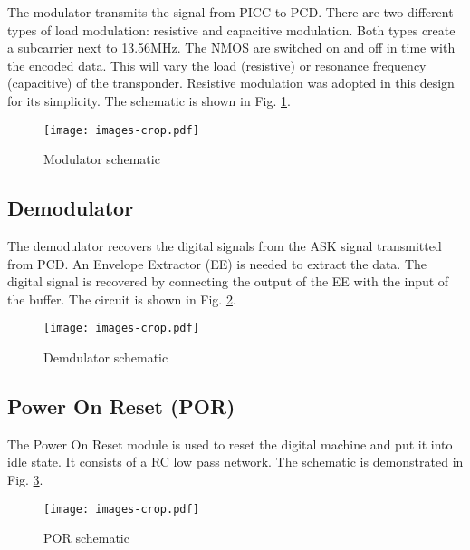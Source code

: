 The modulator transmits the signal from PICC to PCD. There are two different types of load modulation: resistive and capacitive modulation. Both types create a subcarrier next to 13.56MHz. The NMOS are switched on and off in time with the encoded data. This will vary the load (resistive) or resonance frequency  (capacitive) of the transponder.  Resistive modulation was adopted in this design for its simplicity. The schematic is shown in Fig. \ref{fig:mod}.

\begin{figure}[h]
  \centering
  \texttt{[image: images-crop.pdf]}
  \caption{Modulator schematic}
  \label{fig:mod}
\end{figure}

\subsection{Demodulator}

The demodulator recovers the digital signals from the ASK signal transmitted from PCD. An Envelope Extractor (EE) is needed to extract the data. The digital signal is recovered by connecting the output of the EE with the input of the buffer.  The circuit is shown in Fig. \ref{fig:demod}. 

\begin{figure}[h]
  \centering
  \texttt{[image: images-crop.pdf]}
  \caption{Demdulator schematic}
  \label{fig:demod}
\end{figure}

\subsection{Power On Reset (POR)}

The Power On Reset module is used to reset the digital machine and put it into idle state. It consists of a RC low pass network. The schematic is demonstrated in Fig. \ref{fig:por}. 

\begin{figure}[h]
  \centering
  \texttt{[image: images-crop.pdf]}
  \caption{POR schematic}
  \label{fig:por}
\end{figure}